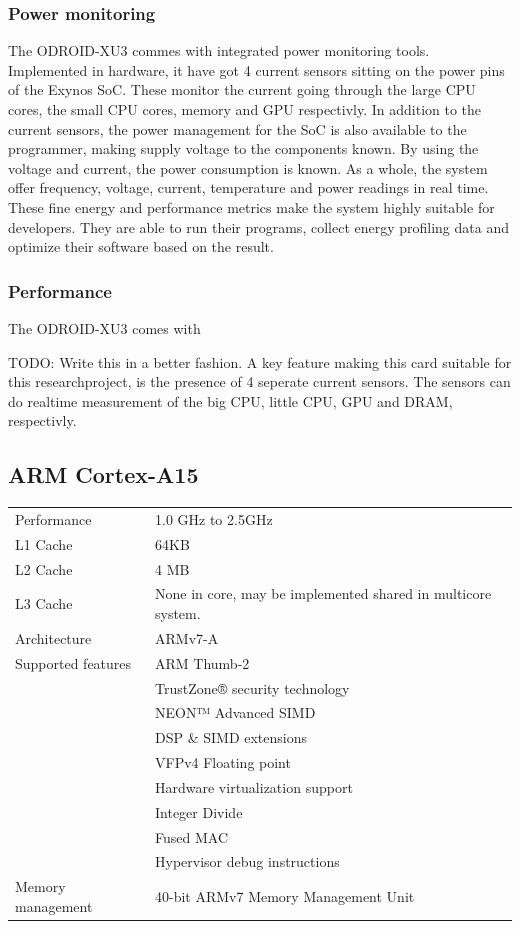 \subsubsection{Power monitoring}
The ODROID-XU3 commes with integrated power monitoring tools.
Implemented in hardware, it have got 4 current sensors sitting on the power pins of the Exynos SoC.
These monitor the current going through the large CPU cores, the small CPU cores, memory and GPU respectivly.
In addition to the current sensors, the power management for the SoC is also available to the programmer, making supply voltage to the components known.
By using the voltage and current, the power consumption is known.
As a whole, the system offer frequency, voltage, current, temperature and power readings in real time.
These fine energy and performance metrics make the system highly suitable for developers.
They are able to run their programs, collect energy profiling data and optimize their software based on the result.

\subsubsection{Performance}
The ODROID-XU3 comes with 


TODO: Write this in a better fashion.
A key feature making this card suitable for this researchproject, is the presence of 4 seperate current sensors.
The sensors can do realtime measurement of the big CPU, little CPU, GPU and DRAM, respectivly.

\subsection{ARM Cortex-A15}
\begin{table}[H]
  \begin{tabular}{ll}
    Performance       & 1.0 GHz to 2.5GHz  \\
    L1 Cache          & 64KB \\
    L2 Cache          & 4 MB \\
    L3 Cache          & None in core, may be implemented shared in multicore system. \\
    Architecture      & ARMv7-A            \\
    Supported features& ARM Thumb-2 \\
                      & TrustZone® security technology \\
                      & NEON™ Advanced SIMD \\
                      & DSP \& SIMD extensions \\
                      & VFPv4 Floating point \\
                      & Hardware virtualization support \\
                      & Integer Divide \\
                      & Fused MAC \\
                      & Hypervisor debug instructions \\
    Memory management & 40-bit ARMv7 Memory Management Unit
  \end{tabular}
\end{table}
